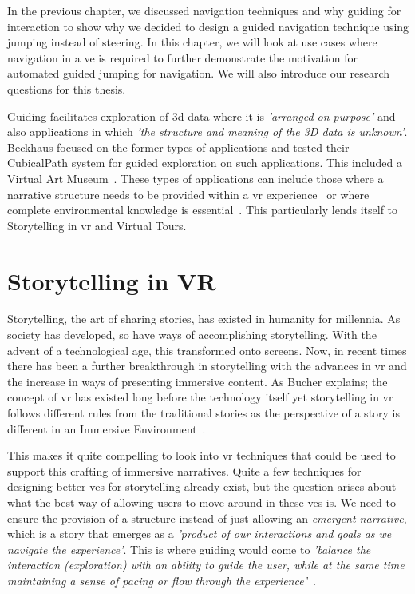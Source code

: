 \label{Chapter:Guided Jumping Motivation}
In the previous chapter, we discussed navigation techniques and why guiding for interaction to show why we decided to design a guided navigation technique using jumping instead of steering. In this chapter, we will look at use cases where navigation in a \acrshort{ve} is required to further demonstrate the motivation for automated guided jumping for navigation. We will also introduce our research questions for this thesis. 

Guiding facilitates exploration of \acrshort{3d} data where it is \textit{'arranged on purpose'} and also applications in which \textit{'the structure and meaning of the 3D data is unknown'}. Beckhaus focused on the former types of applications and tested their CubicalPath system for guided exploration on such applications. This included a Virtual Art Museum~\cite{Beckhaus2002}. These types of applications can include those where a narrative structure needs to be provided within a \acrshort{vr} experience~\cite{Galyean1995} or where complete environmental knowledge is essential~\cite{Freitag2018}. This particularly lends itself to Storytelling in \acrshort{vr} and Virtual Tours. 

\section{Storytelling in VR}
\label{section GJM: Storytelling in VR}
Storytelling, the art of sharing stories, has existed in humanity for millennia. As society has developed, so have ways of accomplishing storytelling. With the advent of a technological age, this transformed onto screens. Now, in recent times there has been a further breakthrough in storytelling with the advances in \acrshort{vr} and the increase in ways of presenting immersive content. As Bucher explains; the concept of \acrshort{vr} has existed long before the technology itself yet storytelling in \acrshort{vr} follows different rules from the traditional stories as the perspective of a story is different in an Immersive Environment~\cite{Bucher2017}.

This makes it quite compelling to look into \acrshort{vr} techniques that could be used to support this crafting of immersive narratives. Quite a few techniques for designing better \acrshort{ve}s for storytelling already exist, but the question arises about what the best way of allowing users to move around in these \acrshort{ve}s is. We need to ensure the provision of a structure instead of just allowing an \textit{emergent narrative}, which is a story that emerges as a \textit{'product of our interactions and goals as we navigate the experience'}. This is where guiding would come to \textit{'balance the interaction (exploration) with an ability to guide the user, while at the same time maintaining a sense of pacing or flow through the experience'}~\cite{Galyean1995}.

